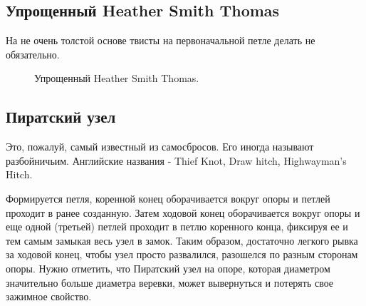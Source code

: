 \subsection{Упрощенный Heather Smith Thomas}

На не очень толстой основе твисты на первоначальной петле делать не обязательно.

\begin{figure}[H]\centering
	\subfloat[Завязывание]{\label{ris:Heather_Smith_Thomas_prosto_1}
	\tcbox[enhanced jigsaw,colframe=black,opacityframe=0.5,opacityback=0.5,height=5cm]
		{\centering
			}
		}
\hfil
	\subfloat[Завязывание]{\label{ris:Heather_Smith_Thomas_prosto_2}
	\tcbox[enhanced jigsaw,colframe=black,opacityframe=0.5,opacityback=0.5,height=5cm]
		{\centering
			}
		}
\hfil
	\subfloat[Результат]{\label{ris:Heather_Smith_Thomas_prosto_3}
	\tcbox[enhanced jigsaw,colframe=black,opacityframe=0.5,opacityback=0.5]
		{\centering
			}
		}
	\caption{Упрощенный Heather Smith Thomas.}\label{ris:Heather_Smith_Thomas_prosto}
\end{figure}

\subsection{Пиратский узел}

Это, пожалуй, самый известный из самосбросов. Его иногда называют разбойничьим. Английские названия - Thief Knot, Draw hitch, Highwayman's Hitch.

Формируется петля, коренной конец оборачивается вокруг опоры и петлей проходит в ранее созданную. Затем ходовой конец оборачивается вокруг опоры и еще одной (третьей) петлей проходит в петлю коренного конца, фиксируя ее и тем самым замыкая весь узел в замок. Таким образом, достаточно легкого рывка за ходовой конец, чтобы узел просто развалился, разошелся по разным сторонам опоры. Нужно отметить, что Пиратский узел на опоре, которая диаметром значительно больше диаметра веревки, может вывернуться и потерять свое зажимное свойство.

\begin{figure}[H]\centering
	\subfloat[Завязывание]{\label{ris:Piratsky_1_1}
	\tcbox[enhanced jigsaw,colframe=black,opacityframe=0.5,opacityback=0.5,height=6.5cm]
		{\centering
			}
		}
\hfil
	\subfloat[Завязывание]{\label{ris:Piratsky_1_2}
	\tcbox[enhanced jigsaw,colframe=black,opacityframe=0.5,opacityback=0.5,height=6.5cm]
		{\centering
			}
		}
\end{figure}

